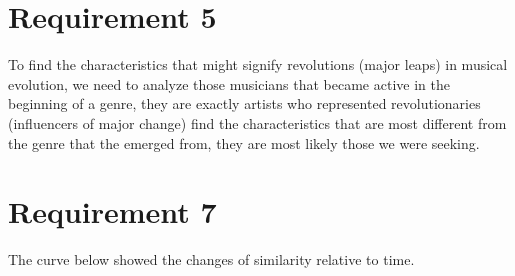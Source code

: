 \documentclass[12pt]{article}
\begin{document}
\section{Requirement 5}
To find the characteristics that might signify revolutions (major leaps) in musical evolution, we need to analyze those musicians that became active in the beginning of
a genre, they are exactly artists who represented revolutionaries (influencers of major
change) find the characteristics that are most different from the genre that the emerged from, they are most likely those we were seeking.
\section{Requirement 7}
The curve below showed the changes of similarity relative to time.


\end{document}
